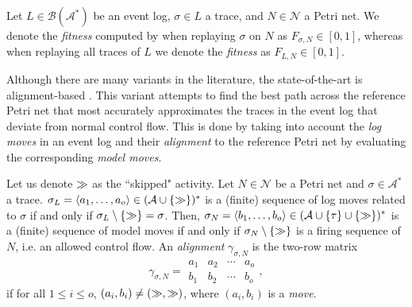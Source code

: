 \begin{definition}[Fitness]
Let $L\in\mathcal{B}(\mathcal{A^*})$ be an event log, $\sigma\in L$ a trace, and $N\in\mathcal{N}$ a Petri net. We denote the \emph{fitness} computed by  when replaying $\sigma$ on $N$ as $F_{\sigma, N}\in[0,1]$, whereas when replaying all traces of $L$ we denote the \emph{fitness} as $F_{L,N}\in[0,1]$.
\end{definition}

Although there are many  variants in the literature, the state-of-the-art is alignment-based . This variant attempts to find the best path across the reference Petri net that most accurately approximates the traces in the event log that deviate from normal control flow. This is done by taking into account the \textit{log moves} in an event log and their \textit{alignment} to the reference Petri net by evaluating the corresponding \textit{model moves}.
\begin{definition}
Let us denote $\gg$ as the ``skipped" activity. Let $N\in\mathcal{N}$ be a Petri net and $\sigma\in \mathcal{A}^*$ a trace. $\sigma_L=\langle a_1,\dots,a_o\rangle\in (\mathcal{A}\cup\{\gg\})^*$ is a (finite) sequence of log moves related to $\sigma$ if and only if $\sigma_L\setminus \{\gg\}=\sigma$. Then, $\sigma_{N}=\langle b_1,\dots, b_o\rangle\in (\mathcal{A} \cup \{\tau\} \cup \{\gg\})^*$ is a (finite) sequence of model moves if and only if $\sigma_{N}\setminus\{\gg\}$ is a firing sequence of $N$, i.e. an allowed control flow. An \emph{alignment} $\gamma_{\sigma, N}$ is the two-row matrix
\begin{equation}
\gamma_{\sigma, N}=
\begin{array}{c|c|c|c}
a_1 & a_2 & \cdots & a_o \\
\hline
b_1 & b_2 & \cdots & b_o
\end{array},
\end{equation}
if for all $1 \leq i \leq o$, $(a_i, b_i) \neq (\gg, \gg)$, where $(a_i,b_i)$ is a \emph{move}. 
\end{definition}
